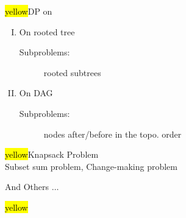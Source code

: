 \begin{frame}{}
  \centerline{\hl{yellow}{\Large DP on }}
  \begin{enumerate}[(I)]
    \setlength{\itemsep}{8pt}
    \item On rooted tree
      \begin{description}
	\item[Subproblems:] rooted subtrees
      \end{description}
    \item On DAG
      \begin{description}
	\item[Subproblems:] nodes after/before in the topo. order
      \end{description}
  \end{enumerate}

  \pause
  \vspace{0.60cm}
  \begin{center}
    \hl{yellow}{\Large Knapsack Problem} \\[12pt]

    Subset sum problem, Change-making problem
  \end{center}
\end{frame}

\begin{frame}{}
  \centerline{\huge And Others $\dots$}

  \vspace{0.30cm}
\end{frame}

\begin{frame}
  \centerline{\hl{yellow}{}}

  \pause
  \vspace{-0.30cm}
\end{frame}
  
